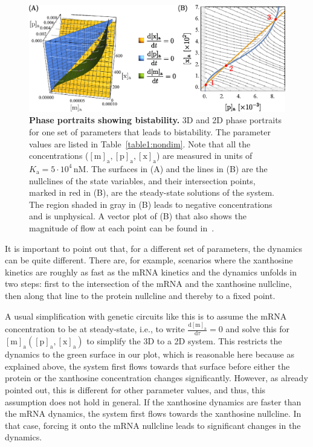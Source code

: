 \documentclass[10pt,letterpaper]{article}
\newcommand{\unit}[1]{\,\mathrm{#1}}
\newcommand{\n}[1]{\mathrm{#1}}
\newcommand{\dd}[2]{\frac{\mathrm{d} #1}{\mathrm{d} #2}}
\begin{document}
	\begin{figure}%
		\centering
		\includegraphics{media/Bistability.eps}
		\caption{{\bf Phase portraits showing bistability.}
			3D and 2D phase portraits for one set of parameters that leads to
			bistability. The parameter values are listed in
			Table~\ref{table1:nondim}. Note that all the concentrations
			($\n{[m]_a}, \n{[p]_a}, \n{[x]_a}$) are measured in units of
			$K_{\n{a}} = 5 \cdot 10^{4} \unit{nM}$. The surfaces in (A) and the
			lines in (B) are the nullclines of the state variables, and their
			intersection points, marked in red in (B), are the steady-state
			solutions of the system. The region shaded in gray in (B) leads to
			negative concentrations and is unphysical. A vector plot of (B) that
			also shows the magnitude of flow at each point can be found
			in~.}
		\label{fig4:bistability}
	\end{figure}
	
	It is important to point out that, for a different set of parameters, the
	dynamics can be quite different. There are, for example, scenarios where the
	xanthosine kinetics are roughly as fast as the mRNA kinetics and the
	dynamics unfolds in two steps: first to the intersection of the mRNA and the
	xanthosine nullcline, then along that line to the protein nullcline and
	thereby to a fixed point.
	
	A usual simplification with genetic circuits like this is to assume the mRNA
	concentration to be at steady-state, i.e., to write $\dd{\n{[m]_a}}{\tau}=0$
	and solve this for $\n{[m]_a}(\n{[p]_a},\n{[x]_a})$ to simplify the 3D to a
	2D system. This restricts the dynamics to the green surface in our plot, which
	is reasonable here because as explained above, the system first flows
	towards that surface before either the protein or the xanthosine concentration
	changes significantly. However, as already pointed out, this is different
	for other parameter values, and thus, this assumption does not hold in general.
	If the xanthosine dynamics are faster than the mRNA dynamics, the
	system first flows towards the xanthosine nullcline. In that case, forcing
	it onto the mRNA nullcline leads to significant changes in the dynamics.
	
\end{document}
